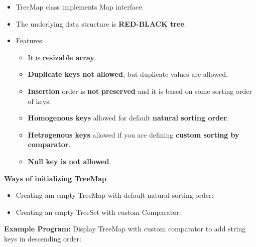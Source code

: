 \setlength{\columnsep}{3pt}
\begin{flushleft}
	
	\begin{itemize}
		\item TreeMap class implements Map interface.
		\item The underlying data structure is \textbf{RED-BLACK tree}.
		
		\item Features:
		\begin{itemize}
			\item It is \textbf{resizable array}.
			\item \textbf{Duplicate keys not allowed}, but duplicate values are allowed.
			\item \textbf{Insertion} order is \textbf{not} \textbf{preserved} and it is based on some sorting order of keys.
			\item \textbf{Homogenous keys} allowed for default \textbf{natural sorting order}.
			\item \textbf{Hetrogenous keys} allowed if you are defining \textbf{custom sorting by comparator}.
			\item \textbf{Null key is not allowed}.
		\end{itemize}			
	\end{itemize}

	
	\textbf{Ways of initializing TreeMap}
	\begin{itemize}
		\item Creating am empty TreeMap with default natural sorting order:
		\bigskip
		
		\bigskip
		
		\item Creating an empty TreeSet with custom Comparator:
		\bigskip
		
	\end{itemize}
	
	\newpage
	
	\textbf{Example Program:} Display TreeMap with custom comparator to add string keys in descending order:
	

\end{flushleft}
